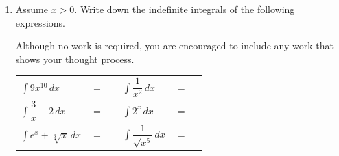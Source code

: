 \documentclass[11pt]{article}
\begin{document}
\begin{enumerate}
    In addition, we know that $g(x)$ satisfies the following.

    \[\int_5^3g(x)=-2\,dx\]

    \[\int_0^3g(x)=10\,dx\]

    Find the values of the following integrals.

    \begin{enumerate}
        \item $\displaystyle\int_5^7f(x)\,dx$

        \vfill

        \item $\displaystyle\int_3^52f(x)-g(x)\,dx$

        \vfill

        \item $\displaystyle\int_0^5 2f(x)-g(x)\,dx$

        \vfill
    \end{enumerate}


\newpage


\item Assume $x>0$. Write down the indefinite integrals of the following expressions. 

Although no work is required, you are encouraged to include any work that shows your thought process. 


\begin{center}
        \begin{tabular}{l c r l c r}
            $\displaystyle\int 9x^{10}\,dx$ & $=$ & \rule[-8pt]{1.5in}{0.4pt} &
            $\displaystyle\int \dfrac{1}{x^2} \,dx$ & $=$ & \rule[-8pt]{1.5in}{0.4pt}\\[1in]
            $\displaystyle\int \dfrac{3}{x}-2\,dx$ & $=$ & \rule[-8pt]{1.5in}{0.4pt}&
            $\displaystyle\int 2^x\,dx$ & $=$ & \rule[-8pt]{1.5in}{0.4pt}\\[1in]
            $\displaystyle\int e^x+\sqrt[3]{x} \,dx$ & $=$ & \rule[-8pt]{1.5in}{0.4pt} & 
            $\displaystyle\int \dfrac{1}{\sqrt{x^5}} \,dx$ & $=$ & \rule[-8pt]{1.5in}{0.4pt}\\[0.3in]
        \end{tabular}
\end{center}


\end{enumerate}
\end{document}
